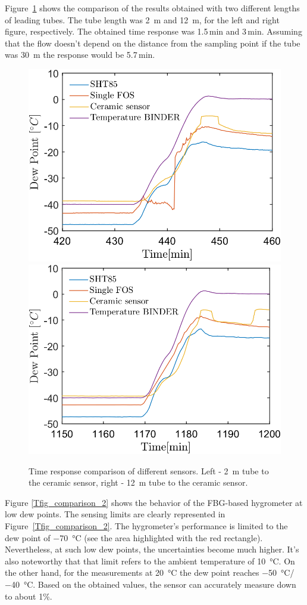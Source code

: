 Figure~\ref{fig_comparison_hw} shows the comparison of the results obtained with two different lengths of leading tubes. The tube length was \SI{2}{\metre} and \SI{12}{\metre}, for the left and right figure, respectively. The obtained time response was 1.5\,min and 3\,min. Assuming that the flow doesn't depend on the distance from the sampling point if the tube was \SI{30}{\metre} the response would be 5.7\,min. 
\begin{figure}[!h]
\centering
\includegraphics[width=0.47\columnwidth]{Chapter5/images/DPCPercent_response2m.png}
\includegraphics[width=0.47\columnwidth]{Chapter5/images/DPCPercent_response12m.png}
\caption{Time response comparison of different sensors. Left - \SI{2}{\metre} tube to the ceramic sensor, right - \SI{12}{\metre} tube to the ceramic sensor.}
\label{fig_comparison_hw}
\end{figure}
\newpage
Figure \ref{Tfig_comparison_2} shows the behavior of the \gls{FBG}-based hygrometer at low dew points. The sensing limits are clearly represented in Figure~\ref{Tfig_comparison_2}. The hygrometer's performance is limited to the dew point of \SI{-70}{\celsius} (see the area highlighted with the red rectangle). Nevertheless, at such low dew points, the uncertainties become much higher. It's also noteworthy that that limit refers to the ambient temperature of \SI{10}{\celsius}. On the other hand, for the measurements at \SI{20}{\celsius} the dew point reaches \SI{-50}{\celsius}/\SI{-40}{\celsius}. Based on the obtained values, the sensor can accurately measure down to about 1\%. 

